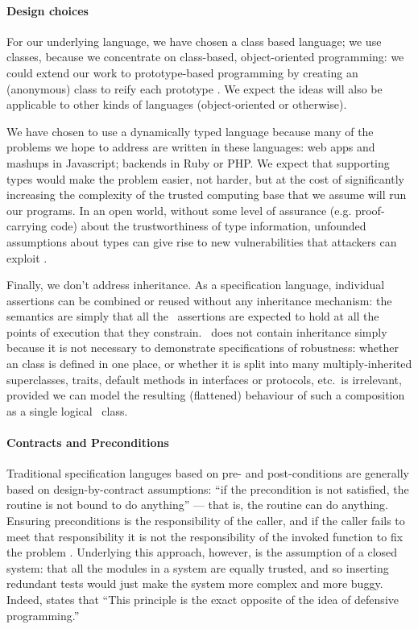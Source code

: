 
\paragraph{Design choices}

For our underlying language, we have chosen a class based language; we
use classes, because we concentrate on class-based, object-oriented
programming: we could extend our work to prototype-based programming
by creating an (anonymous) class to reify each
prototype \cite{graceClasses}. We expect the ideas will also be
applicable to other kinds of languages (object-oriented or
otherwise).

We have chosen to use a dynamically typed language because many of the
problems we hope to address are written in these
languages: web apps and mashups in Javascript; backends in Ruby or
PHP.  We expect that supporting types would make the problem easier,
not harder, but at the cost of significantly increasing the complexity
of the trusted computing base that we assume will run our programs. In
an open world, without some level of assurance (e.g. proof-carrying
code) about the trustworthiness of type information, unfounded
assumptions about types can give rise to new vulnerabilities that
attackers can exploit \cite{pickles}.

Finally, we don't address inheritance. As a specification language,
individual \Chainmail assertions can be combined or reused without any
inheritance mechanism: the semantics are simply that all
the \Chainmail\ assertions are expected to hold at all the points of
execution that they constrain.  \LangOO\ does not contain inheritance
simply because it is not necessary to demonstrate specifications of
robustness: whether an \LangOO class is defined in one place, or
whether it is split into many multiply-inherited superclasses, traits,
default methods in interfaces or protocols, etc.\ is irrelevant,
provided we can model the resulting (flattened) behaviour of such a
composition as a single logical \LangOO\ class.

\paragraph{Contracts and Preconditions}

Traditional specification languges based on pre- and post-conditions
are generally based on design-by-contract assumptions: ``if the
precondition is not satisfied, the routine is not bound to do
anything'' \cite{meyer92dbc} --- that is, the routine can do
anything. Ensuring preconditions is the responsibility of the caller,
and if the caller fails to meet that responsibility it is not the
responsibility of the invoked function to fix the problem \cite{Mey88}.
Underlying this approach, however, is the assumption of a closed
system: that all the modules in a system are equally trusted, and so
inserting redundant tests would just make the system more complex and
more buggy. Indeed, \citet{meyer92dbc} states that ``This principle is
the exact opposite of the idea of defensive programming.''

